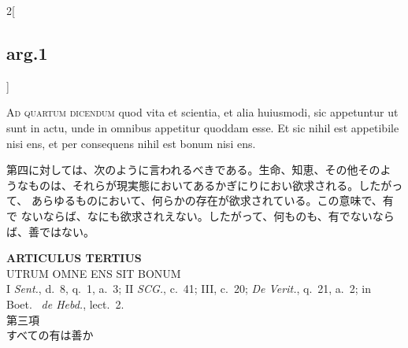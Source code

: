 \documentclass[paper=a4paper,fontsize=10pt,jafontsize=9pt,titlepage]{jlreq}
\begin{document}
\begin{paracol}{2}[\subsection{arg.1}]
\switchcolumn*[\subsection{ad.4}]

{\scshape Ad quartum dicendum} quod vita et scientia, et alia huiusmodi,
 sic appetuntur ut sunt in actu, unde in omnibus appetitur quoddam
 esse. Et sic nihil est appetibile nisi ens, et per consequens nihil est
 bonum nisi ens.

\switchcolumn

第四に対しては、次のように言われるべきである。生命、知恵、その他そのよ
うなものは、それらが現実態においてあるかぎにりにおい欲求される。したがって、
 あらゆるものにおいて、何らかの存在が欲求されている。この意味で、有で
 ないならば、なにも欲求されえない。したがって、何ものも、有でないなら
 ば、善ではない。

\end{paracol}
\newpage
{}
{}
\setcounter{section}{3}
\setcounter{subsection}{0}
 

\begin{center}
 {\Large {\bfseries ARTICULUS TERTIUS}}\\
 {\large UTRUM OMNE ENS SIT BONUM}\\
 {\footnotesize I {\itshape Sent.}, d.~8, q.~1, a.~3; II {\itshape
 SCG.}, c.~41; III, c.~20; {\itshape De Verit.}, q.~21, a.~2; in Boet.~
 {\itshape de Hebd.}, lect.~2.}\\
 {\Large 第三項\\すべての有は善か}
\end{center}
\end{document}
